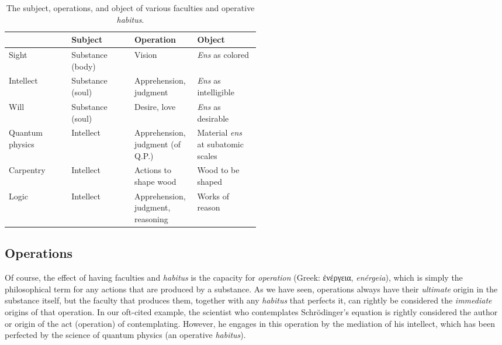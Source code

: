 \documentclass[
  12pt,
]{memoir}
\begin{document}
\begin{table}[ht]
\begin{center}
\caption{The subject, operations, and object of various faculties and operative \emph{habitus}.}
\label{tab:subject-operation-object}
{
\disablehyphenation
\begin{adjustbox}{max width=\textwidth}
\begin{tabular}{l|l|L{0.25\linewidth}|L{0.25\linewidth}}
\toprule
 & Subject & Operation & Object \\
\midrule
Sight & Substance (body) & Vision & \emph{Ens} as colored \\ 
Intellect & Substance (soul) & Apprehension, judgment & \emph{Ens} as intelligible \\
Will & Substance (soul) & Desire, love & \emph{Ens} as desirable \\
\midrule
Quantum physics & Intellect & Apprehension, judgment (of Q.P.) & Material \emph{ens} at subatomic scales \\
\midrule
Carpentry & Intellect & Actions to shape wood & Wood to be shaped \\
\midrule
Logic & Intellect & Apprehension, judgment, reasoning & Works of reason \\
\bottomrule
\end{tabular}
\end{adjustbox}
}
\end{center}
\end{table}

\subsection{Operations}\label{operations}

Of course, the effect of having faculties and \emph{habitus} is the
capacity for \emph{operation} (Greek: ἐνέργεια, \emph{enérgeia}), which
is simply the philosophical term for any actions that are produced by a
substance. As we have seen, operations always have their \emph{ultimate}
origin in the substance itself, but the faculty that produces them,
together with any \emph{habitus} that perfects it, can rightly be
considered the \emph{immediate} origins of that operation. In our
oft-cited example, the scientist who contemplates Schrödinger's equation
is rightly considered the author or origin of the act (operation) of
contemplating. However, he engages in this operation by the mediation of
his intellect, which has been perfected by the science of quantum
physics (an operative \emph{habitus}).
\end{document}
